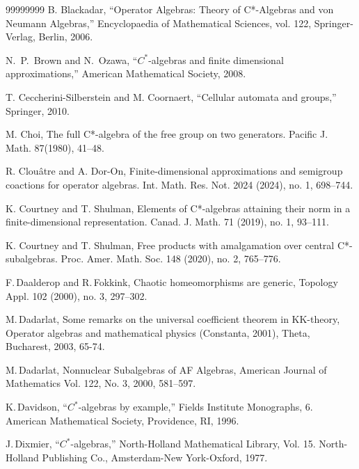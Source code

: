 \documentclass[11 pt, leqno, hidelinks]{amsart}%
\theoremstyle{plain}
\numberwithin{equation}{section}
\begin{document}
\begin{thebibliography}{99999999}
B. Blackadar, ``Operator Algebras: Theory of C*-Algebras and von Neumann Algebras,''
Encyclopaedia of Mathematical Sciences, vol. 122, Springer-Verlag, Berlin, 2006.



N.\ P.\ Brown and N.\ Ozawa,  ``{$C^*$}-algebras and finite dimensional approximations,'' {\rm American Mathematical Society, 2008}.

T. Ceccherini-Silberstein and M. Coornaert, ``Cellular automata and groups,'' Springer, 2010.

M. Choi, The full C*-algebra of the free group on two generators. Pacific J. Math. 87(1980), 41--48.

R. Clou\^{a}tre and A. Dor-On, Finite-dimensional approximations and semigroup coactions for operator algebras. Int. Math. Res. Not. 2024 (2024), no. 1, 698--744.



 K. Courtney and T. Shulman, Elements of C*-algebras attaining their norm in a finite-dimensional representation. Canad. J. Math. 71 (2019), no. 1, 93--111.

K. Courtney and T. Shulman, Free products with amalgamation over central C*-subalgebras. Proc. Amer. Math. Soc. 148 (2020), no. 2, 765--776.

 F.\,Daalderop and R.\,Fokkink,
Chaotic homeomorphisms are generic,
Topology Appl. 102 (2000), no. 3, 297--302.

 M.\,Dadarlat, Some remarks on the universal coefficient theorem in KK-theory, Operator
algebras and mathematical physics (Constanta, 2001), Theta, Bucharest, 2003, 65-74.

M.\,Dadarlat, Nonnuclear Subalgebras of AF Algebras,
American Journal of Mathematics
Vol. 122, No. 3, 2000,   581--597.



K.\,Davidson,  ``{$C^*$}-algebras by example,''  Fields Institute Monographs, 6. American Mathematical Society, Providence, RI, 1996.



J.\,Dixmier,  ``{$C^*$}-algebras,''  North-Holland Mathematical Library, Vol. 15. North-Holland Publishing Co., Amsterdam-New York-Oxford, 1977.




\end{thebibliography}
\end{document}
